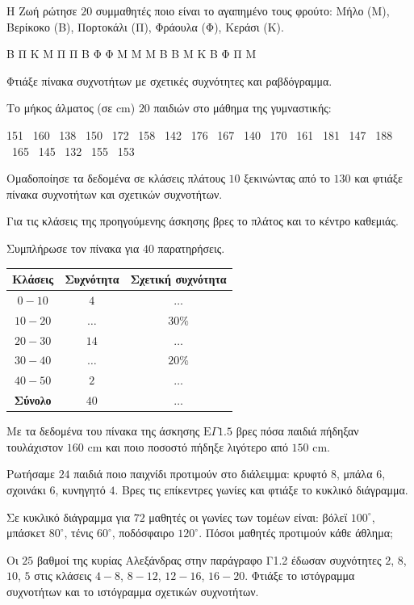\ex Η Ζωή ρώτησε $20$ συμμαθητές ποιο είναι το αγαπημένο τους φρούτο: Μήλο (Μ), Βερίκοκο (Β), Πορτοκάλι (Π), Φράουλα (Φ), Κεράσι (Κ).\par
\noindent Β Π Κ Μ Π Π Β Φ Φ Μ Μ Μ Β Β Μ Κ Β Φ Π Μ\par
Φτιάξε πίνακα συχνοτήτων με σχετικές συχνότητες και ραβδόγραμμα.

\ex Το μήκος άλματος (σε cm) $20$ παιδιών στο μάθημα της γυμναστικής:\par
\noindent\mbox{}\hfill 151 \ 160 \ 138 \ 150 \ 172 \ 158 \ 142 \ 176 \ 167 \ 140 \ 170 \ 161 \ 181 \ 147 \ 188 \ 165 \ 145 \ 132 \ 155 \ 153\hfill\mbox{}\par
Ομαδοποίησε τα δεδομένα σε κλάσεις πλάτους $10$ ξεκινώντας από το $130$ και φτιάξε πίνακα συχνοτήτων και σχετικών συχνοτήτων.

\ex Για τις κλάσεις της προηγούμενης άσκησης βρες το πλάτος και το κέντρο καθεμιάς.

\ex Συμπλήρωσε τον πίνακα για $40$ παρατηρήσεις.
\begin{center}
\renewcommand{\arraystretch}{1.2}
\begin{tabular}{ccc}
\toprule
\textbf{Κλάσεις} & \textbf{Συχνότητα} & \textbf{Σχετική συχνότητα}\\
\midrule
$0-10$ & $4$ & $\ldots$\\
$10-20$ & $\ldots$ & $30\%$\\
$20-30$ & $14$ & $\ldots$\\
$30-40$ & $\ldots$ & $20\%$\\
$40-50$ & $2$ & $\ldots$\\
\midrule
\textbf{Σύνολο} & $40$ & $\ldots$\\
\bottomrule
\end{tabular}
\end{center}

\ex Με τα δεδομένα του πίνακα της άσκησης $\text{Ε}\Gamma1.5$ βρες πόσα παιδιά πήδηξαν τουλάχιστον $160$ cm και ποιο ποσοστό πήδηξε λιγότερο από $150$ cm.

\ex Ρωτήσαμε $24$ παιδιά ποιο παιχνίδι προτιμούν στο διάλειμμα: κρυφτό $8$, μπάλα $6$, σχοινάκι $6$, κυνηγητό $4$. Βρες τις επίκεντρες γωνίες και φτιάξε το κυκλικό διάγραμμα.

\ex Σε κυκλικό διάγραμμα για $72$ μαθητές οι γωνίες των τομέων είναι: βόλεϊ $100^\circ$, μπάσκετ $80^\circ$, τένις $60^\circ$, ποδόσφαιρο $120^\circ$. Πόσοι μαθητές προτιμούν κάθε άθλημα;

\ex Οι $25$ βαθμοί της κυρίας Αλεξάνδρας στην παράγραφο Γ1.2 έδωσαν συχνότητες $2$, $8$, $10$, $5$ στις κλάσεις $4-8$, $8-12$, $12-16$, $16-20$. Φτιάξε το ιστόγραμμα συχνοτήτων και το ιστόγραμμα σχετικών συχνοτήτων.

